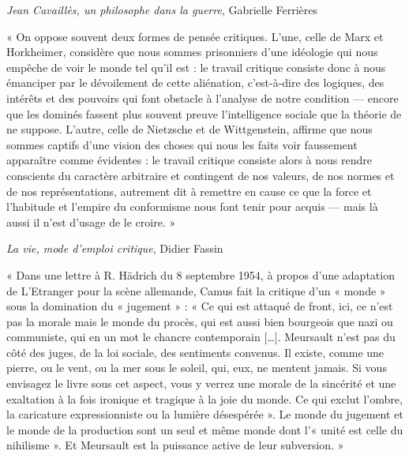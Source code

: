 \documentclass{article}
\begin{document}
\begin{flushright}\textit{Jean Cavaillès, un philosophe dans la guerre}, Gabrielle Ferrières\end{flushright}
\vspace{8pt}
\begin{center} « On oppose souvent deux formes de pensée critiques. L’une, celle de Marx et Horkheimer, considère que nous sommes prisonniers d’une idéologie qui nous empêche de voir le monde tel qu’il est : le travail critique consiste donc à nous émanciper par le dévoilement de cette aliénation, c’est-à-dire des logiques, des intérêts et des pouvoirs qui font obstacle à l’analyse de notre condition — encore que les dominés fassent plus souvent preuve l’intelligence sociale que la théorie de ne suppose. L’autre, celle de Nietzsche et de Wittgenstein, affirme que nous sommes captifs d’une vision des choses qui nous les faits voir faussement apparaître comme évidentes : le travail critique consiste alors à nous rendre conscients du caractère arbitraire et contingent de nos valeurs, de nos normes et de nos représentations, autrement dit à remettre en cause ce que la force et l’habitude et l’empire du conformisme nous font tenir pour acquis — mais là aussi il n’est d’usage de le croire. » \end{center} 

\begin{flushright}\textit{La vie, mode d’emploi critique}, Didier Fassin\end{flushright}
\vspace{8pt}
\begin{center} « Dans une lettre à R. Hädrich du 8 septembre 1954, à propos d’une adaptation de L’Etranger pour la scène allemande, Camus fait la critique d’un « monde » sous la domination du « jugement » : « Ce qui est attaqué de front, ici, ce n’est pas la morale mais le monde du procès, qui est aussi bien bourgeois que nazi ou communiste, qui en un mot le chancre contemporain […]. Meursault n’est pas du côté des juges, de la loi sociale, des sentiments convenus. Il existe, comme une pierre, ou le vent, ou la mer sous le soleil, qui, eux, ne mentent jamais. Si vous envisagez le livre sous cet aspect, vous y verrez une morale de la sincérité et une exaltation à la fois ironique et tragique à la joie du monde. Ce qui exclut l’ombre, la caricature expressionniste ou la lumière désespérée ». 
	Le monde du jugement et le monde de la production sont un seul et même monde dont l’« unité est celle du nihilisme ». Et Meursault est la puissance active de leur subversion.
» \end{center}
\end{document}
